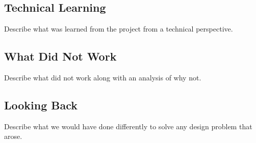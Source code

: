 {\subsection{Technical Learning}
Describe what was learned from the project from a technical perspective.

\subsection{What Did Not Work}
Describe what did not work along with an analysis of why not.

\subsection{Looking Back}
Describe what we would have done differently to solve any design problem that arose.

}
